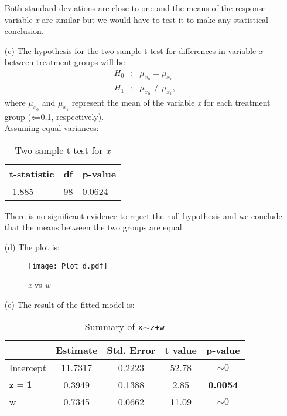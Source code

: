 \documentclass[11pt,a4paper]{article}
\begin{document}
\begin{enumerate}
Both standard deviations are close to one and the means of the response variable \emph{x} are similar but we would have to test it 
to make any statistical conclusion.

\item[(c)]
The hypothesis for the two-sample t-test for differences in variable \emph{x} between treatment 
groups will be
\begin{eqnarray*}
  H_0 &:& \mu_{x_0} =\mu_{x_1}\\
  H_1 &:& \mu_{x_0} \neq \mu_{x_1},
\end{eqnarray*}
where $\mu_{x_0}$ and $\mu_{x_1}$ represent the mean of the variable \emph{x} for each treatment group (\emph{z}=0,1, respectively).\\
Assuming equal variances:

\begin{table}[h!]
\centering
\begin{tabular}{lll}
\hline
t-statistic & df & p-value\\
\hline
 -1.885 & 98 & 0.0624\\
\hline
\end{tabular}
\caption{Two sample t-test for \emph{x}}
\end{table}

There is no significant evidence to reject the null hypothesis and we conclude that the means between the two groups are equal. 

\newpage
\item[(d)]
The plot is:
\begin{figure}[h!]
\centering
\texttt{[image: Plot\_d.pdf]}
\vspace{-0.6cm}
\caption{\emph{x} vs \emph{w}}
\end{figure}

\item[(e)]
The result of the fitted model is:
\begin{table}[h!]
\centering
\begin{tabular}{lcccc}
  \hline
 & Estimate & Std. Error & t value & p-value \\ 
  \hline
Intercept & 11.7317 & 0.2223 & 52.78 & $\sim 0$ \\ 
  $\mathbf{z=1}$ & 0.3949 & 0.1388 & 2.85 & \textbf{0.0054} \\ 
  w & 0.7345 & 0.0662 & 11.09 & $\sim 0$ \\ 
   \hline
\end{tabular}
\caption{Summary of \texttt{x$\sim$z+w} }
\end{table}


\end{enumerate}
\end{document}
